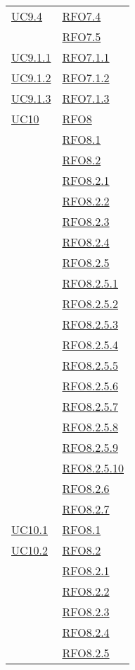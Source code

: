 \begin{longtable}{|>{\centering}m{5cm}|m{5cm}<{\centering}|}
\hyperlink{UC9.4}{UC9.4} & \hyperlink{RFO7.4}{RFO7.4}\\
& \hyperlink{RFO7.5}{RFO7.5}\\\hline
\hyperlink{UC9.1.1}{UC9.1.1} & \hyperlink{RFO7.1.1}{RFO7.1.1}\\\hline
\hyperlink{UC9.1.2}{UC9.1.2} & \hyperlink{RFO7.1.2}{RFO7.1.2}\\\hline
\hyperlink{UC9.1.3}{UC9.1.3} & \hyperlink{RFO7.1.3}{RFO7.1.3}\\\hline
\hyperlink{UC10}{UC10} & \hyperlink{RFO8}{RFO8}\\
& \hyperlink{RFO8.1}{RFO8.1}\\
& \hyperlink{RFO8.2}{RFO8.2}\\
& \hyperlink{RFO8.2.1}{RFO8.2.1}\\
& \hyperlink{RFO8.2.2}{RFO8.2.2}\\
& \hyperlink{RFO8.2.3}{RFO8.2.3}\\
& \hyperlink{RFO8.2.4}{RFO8.2.4}\\
& \hyperlink{RFO8.2.5}{RFO8.2.5}\\
& \hyperlink{RFO8.2.5.1}{RFO8.2.5.1}\\
& \hyperlink{RFO8.2.5.2}{RFO8.2.5.2}\\
& \hyperlink{RFO8.2.5.3}{RFO8.2.5.3}\\
& \hyperlink{RFO8.2.5.4}{RFO8.2.5.4}\\
& \hyperlink{RFO8.2.5.5}{RFO8.2.5.5}\\
& \hyperlink{RFO8.2.5.6}{RFO8.2.5.6}\\
& \hyperlink{RFO8.2.5.7}{RFO8.2.5.7}\\
& \hyperlink{RFO8.2.5.8}{RFO8.2.5.8}\\
& \hyperlink{RFO8.2.5.9}{RFO8.2.5.9}\\
& \hyperlink{RFO8.2.5.10}{RFO8.2.5.10}\\
& \hyperlink{RFO8.2.6}{RFO8.2.6}\\
& \hyperlink{RFO8.2.7}{RFO8.2.7}\\\hline
\hyperlink{UC10.1}{UC10.1} & \hyperlink{RFO8.1}{RFO8.1}\\\hline
\hyperlink{UC10.2}{UC10.2} & \hyperlink{RFO8.2}{RFO8.2}\\
& \hyperlink{RFO8.2.1}{RFO8.2.1}\\
& \hyperlink{RFO8.2.2}{RFO8.2.2}\\
& \hyperlink{RFO8.2.3}{RFO8.2.3}\\
& \hyperlink{RFO8.2.4}{RFO8.2.4}\\
& \hyperlink{RFO8.2.5}{RFO8.2.5}\\

\end{longtable}
